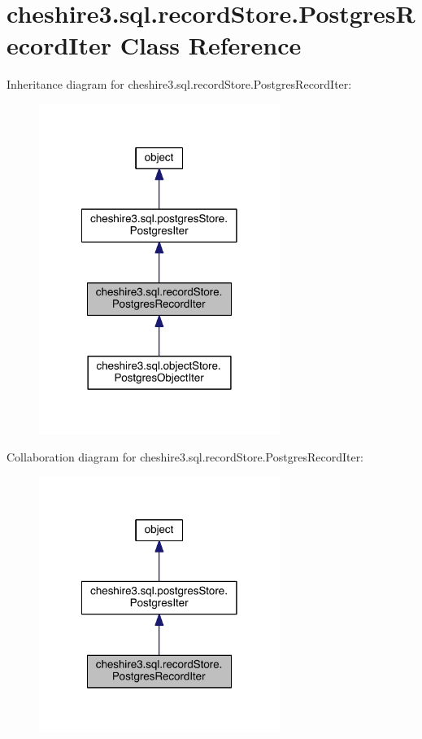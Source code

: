\hypertarget{classcheshire3_1_1sql_1_1record_store_1_1_postgres_record_iter}{\section{cheshire3.\-sql.\-record\-Store.\-Postgres\-Record\-Iter Class Reference}
\label{classcheshire3_1_1sql_1_1record_store_1_1_postgres_record_iter}
}


Inheritance diagram for cheshire3.\-sql.\-record\-Store.\-Postgres\-Record\-Iter\-:
\nopagebreak
\begin{figure}[H]
\begin{center}
\leavevmode
\includegraphics[width=222pt]{classcheshire3_1_1sql_1_1record_store_1_1_postgres_record_iter__inherit__graph}
\end{center}
\end{figure}


Collaboration diagram for cheshire3.\-sql.\-record\-Store.\-Postgres\-Record\-Iter\-:
\nopagebreak
\begin{figure}[H]
\begin{center}
\leavevmode
\includegraphics[width=222pt]{classcheshire3_1_1sql_1_1record_store_1_1_postgres_record_iter__coll__graph}
\end{center}
\end{figure}
